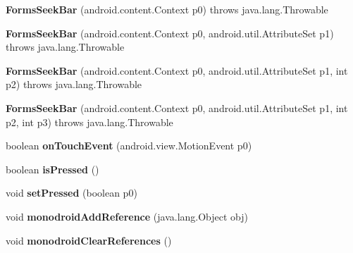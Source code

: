 \begin{DoxyCompactItemize}
\item 
\mbox{\label{classmd5b60ffeb829f638581ab2bb9b1a7f4f3f_1_1_forms_seek_bar_a702512b58f3e4e250bf52ad5c064f83a}} 
{\bfseries Forms\+Seek\+Bar} (android.\+content.\+Context p0)  throws java.\+lang.\+Throwable 	
\item 
\mbox{\label{classmd5b60ffeb829f638581ab2bb9b1a7f4f3f_1_1_forms_seek_bar_a2fed7f17c8acbe1d59dd917b841b8a23}} 
{\bfseries Forms\+Seek\+Bar} (android.\+content.\+Context p0, android.\+util.\+Attribute\+Set p1)  throws java.\+lang.\+Throwable 	
\item 
\mbox{\label{classmd5b60ffeb829f638581ab2bb9b1a7f4f3f_1_1_forms_seek_bar_a2c2467e8fb04433f1c7a2333d4893891}} 
{\bfseries Forms\+Seek\+Bar} (android.\+content.\+Context p0, android.\+util.\+Attribute\+Set p1, int p2)  throws java.\+lang.\+Throwable 	
\item 
\mbox{\label{classmd5b60ffeb829f638581ab2bb9b1a7f4f3f_1_1_forms_seek_bar_afadadb0b016eb3d0ebcb4b884852a46d}} 
{\bfseries Forms\+Seek\+Bar} (android.\+content.\+Context p0, android.\+util.\+Attribute\+Set p1, int p2, int p3)  throws java.\+lang.\+Throwable 	
\item 
\mbox{\label{classmd5b60ffeb829f638581ab2bb9b1a7f4f3f_1_1_forms_seek_bar_a2a80911e4812d35846f878170806ba84}} 
boolean {\bfseries on\+Touch\+Event} (android.\+view.\+Motion\+Event p0)
\item 
\mbox{\label{classmd5b60ffeb829f638581ab2bb9b1a7f4f3f_1_1_forms_seek_bar_a5ba10e44e1797cb266b3fa57c4604e42}} 
boolean {\bfseries is\+Pressed} ()
\item 
\mbox{\label{classmd5b60ffeb829f638581ab2bb9b1a7f4f3f_1_1_forms_seek_bar_a3e8785634191b0032360570d26a6cd8a}} 
void {\bfseries set\+Pressed} (boolean p0)
\item 
\mbox{\label{classmd5b60ffeb829f638581ab2bb9b1a7f4f3f_1_1_forms_seek_bar_a3501991d7e241e3974a47f91a20a02ec}} 
void {\bfseries monodroid\+Add\+Reference} (java.\+lang.\+Object obj)
\item 
\mbox{\label{classmd5b60ffeb829f638581ab2bb9b1a7f4f3f_1_1_forms_seek_bar_ab7e97d04898da771ddfe5cbc716b8d87}} 
void {\bfseries monodroid\+Clear\+References} ()
\end{DoxyCompactItemize}
